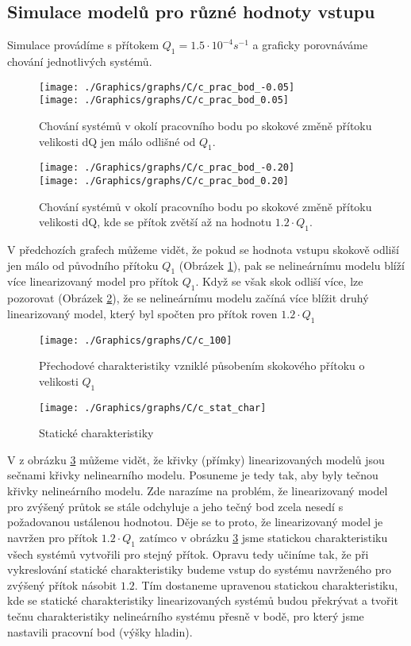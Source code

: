 \documentclass{article}
\begin{document}
		\subsection{Simulace modelů pro různé hodnoty vstupu}
			Simulace provádíme s přítokem \(Q_{1}=1.5\cdot10^{-4}s^{-1}\) a graficky porovnáváme chování jednotlivých systémů.
			\begin{figure}[H]
				\centering
				\texttt{[image: ./Graphics/graphs/C/c\_prac\_bod\_-0.05]}\\
				\texttt{[image: ./Graphics/graphs/C/c\_prac\_bod\_0.05]}
				\caption{Chování systémů v okolí pracovního bodu po skokové změně přítoku velikosti dQ jen málo odlišné od \(Q_{1}\).}
				\label{pic:c_prac_bod0.05}
			\end{figure}
			\begin{figure}[H]
				\centering
				\texttt{[image: ./Graphics/graphs/C/c\_prac\_bod\_-0.20]}\\
				\texttt{[image: ./Graphics/graphs/C/c\_prac\_bod\_0.20]}
				\caption{Chování systémů v okolí pracovního bodu po skokové změně přítoku velikosti dQ, kde se přítok zvětší až na hodnotu \(1.2\cdot Q_{1}\).}
				\label{pic:c_prac_bod0.2}
			\end{figure}
			\newpage
			V předchozích grafech můžeme vidět, že pokud se hodnota vstupu skokově odliší jen málo od původního přítoku \(Q_{1}\) (Obrázek \ref*{pic:c_prac_bod0.05}), pak se nelineárnímu modelu blíží více linearizovaný model pro přítok \(Q_{1}\). Když se však skok odliší více, lze pozorovat (Obrázek \ref{pic:c_prac_bod0.2}), že se nelineárnímu modelu začíná více blížit druhý linearizovaný model, který byl spočten pro přítok roven \(1.2\cdot Q_{1}\)
			\begin{figure}[H]
				\centering
				\texttt{[image: ./Graphics/graphs/C/c\_100]}
				\caption{Přechodové charakteristiky vzniklé působením skokového přítoku o velikosti \(Q_{1}\)}
			\end{figure}
			\begin{figure}[H]
				\centering
				\texttt{[image: ./Graphics/graphs/C/c\_stat\_char]}
				\caption{Statické charakteristiky}
				\label{pic:c_stat_char1}
			\end{figure}
			V z obrázku \ref{pic:c_stat_char1} můžeme vidět, že křivky (přímky) linearizovaných modelů jsou sečnami křivky nelinearního modelu. Posuneme je tedy tak, aby byly tečnou křivky nelineárního modelu. Zde narazíme na problém, že linearizovaný model pro zvýšený průtok se stále odchyluje a jeho tečný bod zcela nesedí s požadovanou ustálenou hodnotou. Děje se to proto, že linearizovaný model je navržen pro přítok \(1.2\cdot Q_{1}\) zatímco v obrázku \ref{pic:c_stat_char1} jsme statickou charakteristiku všech systémů vytvořili pro stejný přítok. Opravu tedy učiníme tak, že při vykreslování statické charakteristiky budeme vstup do systému navrženého pro zvýšený přítok násobit \(1.2\). Tím dostaneme upravenou statickou charakteristiku, kde se statické charakteristiky linearizovaných systémů budou překrývat a tvořit tečnu charakteristiky nelineárního systému přesně v bodě,  pro který jsme nastavili pracovní bod (výšky hladin).
			
\end{document}
